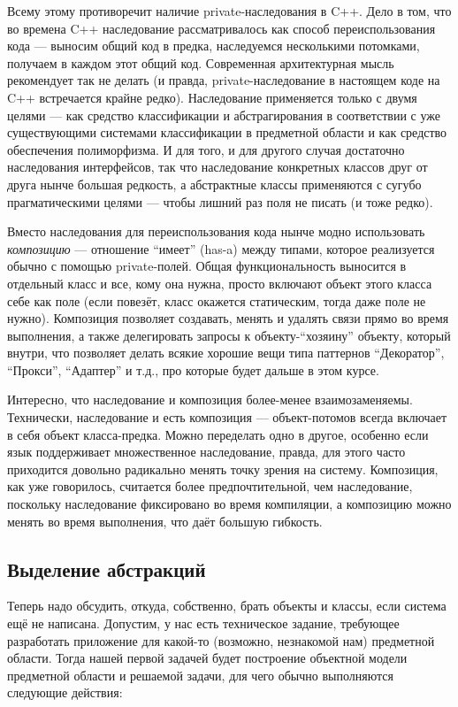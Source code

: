 \documentclass[a5paper]{article}
\begin{document}
Всему этому противоречит наличие private-наследования в C++. Дело в том, что во времена C++ наследование рассматривалось как способ переиспользования кода --- выносим общий код в предка, наследуемся несколькими потомками, получаем в каждом этот общий код. Современная архитектурная мысль рекомендует так не делать (и правда, private-наследование в настоящем коде на C++ встречается крайне редко). Наследование применяется только с двумя целями --- как средство классификации и абстрагирования в соответствии с уже существующими системами классификации в предметной области и как средство обеспечения полиморфизма. И для того, и для другого случая достаточно наследования интерфейсов, так что наследование конкретных классов друг от друга нынче большая редкость, а абстрактные классы применяются с сугубо прагматическими целями --- чтобы лишний раз поля не писать (и тоже редко).

Вместо наследования для переиспользования кода нынче модно использовать \textit{композицию} --- отношение ``имеет'' (has-a) между типами, которое реализуется обычно с помощью private-полей. Общая функциональность выносится в отдельный класс и все, кому она нужна, просто включают объект этого класса себе как поле (если повезёт, класс окажется статическим, тогда даже поле не нужно). Композиция позволяет создавать, менять и удалять связи прямо во время выполнения, а также делегировать запросы к объекту-``хозяину'' объекту, который внутри, что позволяет делать всякие хорошие вещи типа паттернов ``Декоратор'', ``Прокси'', ``Адаптер'' и т.д., про которые будет дальше в этом курсе.

Интересно, что наследование и композиция более-менее взаимозаменяемы. Технически, наследование и есть композиция --- объект-потомов всегда включает в себя объект класса-предка. Можно переделать одно в другое, особенно если язык поддерживает множественное наследование, правда, для этого часто приходится довольно радикально менять точку зрения на систему. Композиция, как уже говорилось, считается более предпочтительной, чем наследование, поскольку наследование фиксировано во время компиляции, а композицию можно менять во время выполнения, что даёт большую гибкость.

\subsection{Выделение абстракций}

Теперь надо обсудить, откуда, собственно, брать объекты и классы, если система ещё не написана. Допустим, у нас есть техническое задание, требующее разработать приложение для какой-то (возможно, незнакомой нам) предметной области. Тогда нашей первой задачей будет построение объектной модели предметной области и решаемой задачи, для чего обычно выполняются следующие действия:
\end{document}
